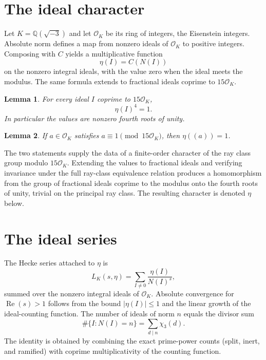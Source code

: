 \documentclass[11pt,a4paper]{article}
\newtheorem{lemma}{Lemma}
\begin{document}
\section{The ideal character}

Let \(K=\mathbb{Q}(\sqrt{-3})\) and let \(\mathcal{O}_K\) be its ring of integers, the Eisenstein integers. Absolute norm defines a map from nonzero ideals of \(\mathcal{O}_K\) to positive integers. Composing with \(C\) yields a multiplicative function
\[
\eta(I)=C(N(I))
\]
on the nonzero integral ideals, with the value zero when the ideal meets the modulus. The same formula extends to fractional ideals coprime to \(15\mathcal{O}_K\).

\begin{lemma}
For every ideal \(I\) coprime to \(15\mathcal{O}_K\),
\[
\eta(I)^4=1.
\]
In particular the values are nonzero fourth roots of unity.
\end{lemma}

\begin{lemma}
If \(a\in\mathcal{O}_K\) satisfies \(a\equiv 1\pmod{15\mathcal{O}_K}\), then \(\eta((a))=1\).
\end{lemma}

The two statements supply the data of a finite-order character of the ray class group modulo \(15\mathcal{O}_K\). Extending the values to fractional ideals and verifying invariance under the full ray-class equivalence relation produces a homomorphism from the group of fractional ideals coprime to the modulus onto the fourth roots of unity, trivial on the principal ray class. The resulting character is denoted \(\eta\) below.

\section{The ideal series}

The Hecke series attached to \(\eta\) is
\[
L_K(s,\eta)=\sum_{I\neq 0}\frac{\eta(I)}{N(I)^s},
\]
summed over the nonzero integral ideals of \(\mathcal{O}_K\). Absolute convergence for \(\operatorname{Re}(s)>1\) follows from the bound \(|\eta(I)|\le 1\) and the linear growth of the ideal-counting function. The number of ideals of norm \(n\) equals the divisor sum
\begin{equation}
\label{eq:coeff}
\#\{I:N(I)=n\}=\sum_{d\mid n}\chi_3(d).
\end{equation}
The identity is obtained by combining the exact prime-power counts (split, inert, and ramified) with coprime multiplicativity of the counting function.
\end{document}

